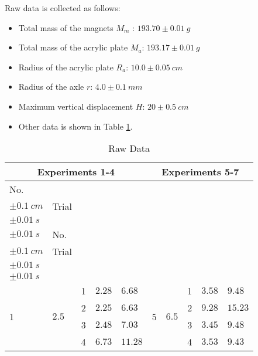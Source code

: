 \documentclass[a4paper]{article}
\begin{document}
Raw data is collected as follows:

\begin{itemize}
    \item Total mass of the magnets $M_m$ : $193.70\pm0.01\SI{}{g}$
    \item Total mass of the acrylic plate $M_a$: $193.17\pm0.01\SI{}{g}$
    \item Radius of the acrylic plate $R_a$: $10.0\pm0.05\SI{}{cm}$
    \item Radius of the axle $r$: $4.0\pm0.1\SI{}{mm}$
    \item Maximum vertical displacement $H$: $20\pm0.5\SI{}{cm}$
    \item Other data is shown in Table \ref{tab.raw}.
\end{itemize}

\begin{table}[ht]
\centering
\caption{Raw Data}
\label{tab.raw}
\begin{tabular}{llllllllll}
\hline
\hline
\multicolumn{5}{c}{Experiments 1-4} & \multicolumn{5}{c}{Experiments 5-7} \\
\hline
No.         & \makecell{$r(\SI{}{cm})$ \\ $\pm \SI{0.1}{cm}$ }  & Trial & \makecell{$t_1(\SI{}{s})$ \\ $\pm \SI{0.01}{s}$ } & \makecell{$t_2(\SI{}{s})$ \\ $\pm \SI{0.01}{s}$ } & 
No.         & \makecell{$r(\SI{}{cm})$ \\ $\pm \SI{0.1}{cm}$ }  & Trial & \makecell{$t_1(\SI{}{s})$ \\ $\pm \SI{0.01}{s}$ } & \makecell{$t_2(\SI{}{s})$ \\ $\pm \SI{0.01}{s}$ } \\
\hline
\multirow{5}{*}{1} & \multirow{5}{*}{$2.5$} & 1     & $2.28$   & $6.68$   & 
\multirow{5}{*}{5} & \multirow{5}{*}{$6.5$} & 1     & $3.58$   & $9.48$   \\
                   &                                & 2     & $2.25$   & $6.63$   &
                   &                                & 2     & $9.28$   & $15.23$  \\
                   &                                & 3     & $2.48$   & $7.03$   &
                   &                                & 3     & $3.45$   & $9.48$   \\
                   &                                & 4     & $6.73$   & $11.28$  &
                   &                                & 4     & $3.53$   & $9.43$   \\

\end{tabular}
\end{table}
\end{document}

